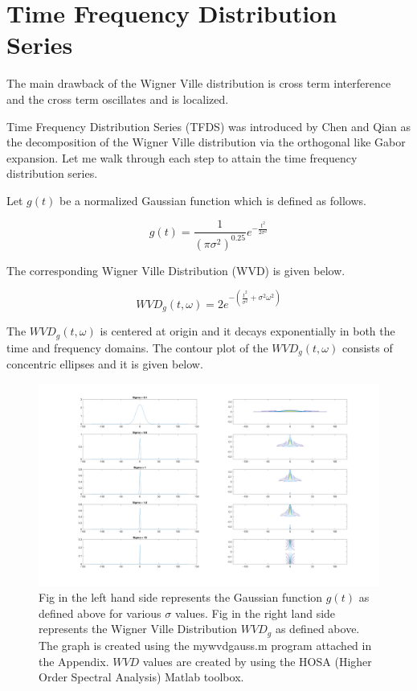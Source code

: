 \section{Time Frequency Distribution Series}

The main drawback of the Wigner Ville distribution is cross term interference and the cross term oscillates and is localized. 

Time Frequency Distribution Series (TFDS) was introduced by Chen and Qian \cite{pchen} as the decomposition of the Wigner Ville distribution via the orthogonal like Gabor expansion. Let me walk through each step to attain the time frequency distribution series. 

Let $g(t)$ be a normalized Gaussian function which is defined as follows. 

\begin{equation}
g(t) = \frac{1}{{(\pi \sigma^2)}^{0.25}} e^{-\frac{t^2}{2 \sigma^2}}
\end{equation}

The corresponding Wigner Ville Distribution (WVD) is given below.

\begin{equation}
WVD_g(t,\omega) = 2 e^{-(\frac{t^2}{\sigma^2}+\sigma^2\omega^2)}
\end{equation}

The $WVD_g(t,\omega)$ is centered at origin and it decays exponentially in both the time and frequency domains. The contour plot of the $WVD_g(t,\omega)$ consists of concentric ellipses and it is given below.


\begin{figure}[!ht]
\includegraphics[scale=.15]{Images/WVD_gauss}
\caption{Fig in the left hand side represents the Gaussian function $g(t)$ as defined above for various $\sigma$ values. Fig in the right land side represents the Wigner Ville Distribution $WVD_g$ as defined above. The graph is created using the mywvdgauss.m program attached in the Appendix. $WVD$ values are created by using the HOSA (Higher Order Spectral Analysis) Matlab toolbox. }
\label{fig:WVD_gauss}
\end{figure}

